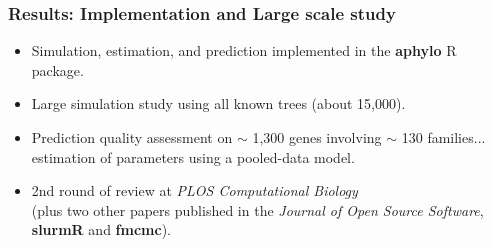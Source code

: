 \documentclass[aspectratio=169, 9pt, handout]{beamer}
\begin{document}
\begin{frame}[t, label=aphylo-good]
\begin{minipage}[m]{.65\linewidth}
	\end{minipage}
\end{frame}


\begin{frame}[label=aphylo-results-overview]
	\frametitle{Results: Implementation and Large scale study}
	\pause
	\begin{itemize}
		\item Simulation, estimation, and prediction implemented in the \textbf{aphylo} R package.	\pause
		\item Large simulation study using all known trees (about 15,000).\pause
		\item Prediction quality assessment on $\sim$ 1,300 genes involving $\sim$ 130 families...	\pause
		estimation of parameters using a pooled-data model. \hyperlink{aphylo-model-levels}{} \hyperlink{aphylo-table}{}\pause
		\item 2nd round of review at \textit{PLOS Computational Biology}\\(\small plus two other papers published in the \textit{Journal of Open Source Software}, \textbf{slurmR} and \textbf{fmcmc}).
	\end{itemize}
\end{frame}
\end{document}
